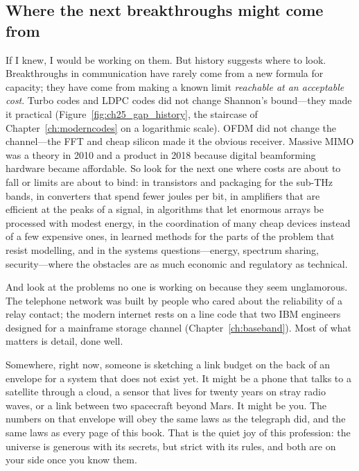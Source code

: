 \subsection{Where the next breakthroughs might come from}




If I knew, I would be working on them. But history suggests where to look. Breakthroughs in
communication have rarely come from a new formula for capacity; they have come from making a known
limit \emph{reachable at an acceptable cost}. Turbo codes and LDPC codes did not change Shannon's
bound---they made it practical (Figure~\ref{fig:ch25_gap_history}, the staircase of
Chapter~\ref{ch:moderncodes} on a logarithmic scale). OFDM did not change the channel---the FFT and cheap silicon made it
the obvious receiver. Massive MIMO was a theory in 2010 and a product in 2018 because digital
beamforming hardware became affordable. So look for the next one where costs are about to fall or
limits are about to bind: in transistors and packaging for the sub-THz bands, in converters that
spend fewer joules per bit, in amplifiers that are efficient at the peaks of a signal, in algorithms
that let enormous arrays be processed with modest energy, in the coordination of many cheap devices
instead of a few expensive ones, in learned methods for the parts of the problem that resist
modelling, and in the systems questions---energy, spectrum sharing, security---where the obstacles
are as much economic and regulatory as technical.

And look at the problems no one is working on because they seem unglamorous. The telephone network
was built by people who cared about the reliability of a relay contact; the modern internet rests on a
line code that two IBM engineers designed for a mainframe storage channel (Chapter~\ref{ch:baseband}). Most of what matters is
detail, done well.

Somewhere, right now, someone is sketching a link budget on the back of an envelope for a system
that does not exist yet. It might be a phone that talks to a satellite through a cloud, a sensor
that lives for twenty years on stray radio waves, or a link between two spacecraft beyond Mars. It
might be you. The numbers on that envelope will obey the same laws as the telegraph did, and the same
laws as every page of this book. That is the quiet joy of this profession: the universe is generous
with its secrets, but strict with its rules, and both are on your side once you know them.


